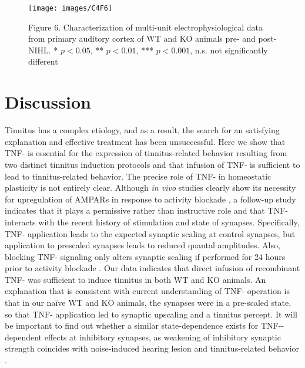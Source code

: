 \begin{figure}
	\centering
		\texttt{[image: images/C4F6]}
	\begin{changemargin}{1in}{1in}
	\footnotesize{Figure 6. Characterization of multi-unit electrophysiological data from primary auditory cortex of WT and KO animals pre- and post-NIHL. * $p<0.05$, ** $p<0.01$, *** $p<0.001$, n.s. not significantly different}
	\end{changemargin}
\end{figure}

\section{Discussion}

Tinnitus has a complex etiology, and as a result, the search for an satisfying explanation and effective treatment has been unsuccessful. Here we show that TNF-\textalpha{} is essential for the expression of tinnitus-related behavior resulting from two distinct tinnitus induction protocols and that infusion of TNF-\textalpha{} is sufficient to lead to tinnitus-related behavior. The precise role of TNF-\textalpha{} in homeostatic plasticity is not entirely clear. Although \textit{in vivo} studies clearly show its necessity for upregulation of AMPARs in response to activity blockade \cite{Stellwagen2006}, a follow-up study indicates that it plays a permissive rather than instructive role and that TNF-\textalpha{} interacts with the recent history of stimulation and state of synapses. Specifically, TNF-\textalpha{} application leads to the expected synaptic scaling at control synapses, but application to prescaled synapses leads to reduced quantal amplitudes. Also, blocking TNF-\textalpha{} signaling only alters synaptic scaling if performed for 24 hours prior to activity blockade \cite{Steinmetz2010}. Our data indicates that direct infusion of recombinant TNF-\textalpha{} was sufficient to induce tinnitus in both WT and KO animals. An explanation that is consistent with current understanding of TNF-\textalpha{} operation is that in our na\"ive WT and KO animals, the synapses were in a pre-scaled state, so that TNF-\textalpha{} application led to synaptic upscaling and a tinnitus percept. It will be important to find out whether a similar state-dependence exists for TNF-\textalpha{}-dependent effects at inhibitory synapses, as weakening of inhibitory synaptic strength coincides with noise-induced hearing lesion and tinnitus-related behavior \cite{Yang2013}.

